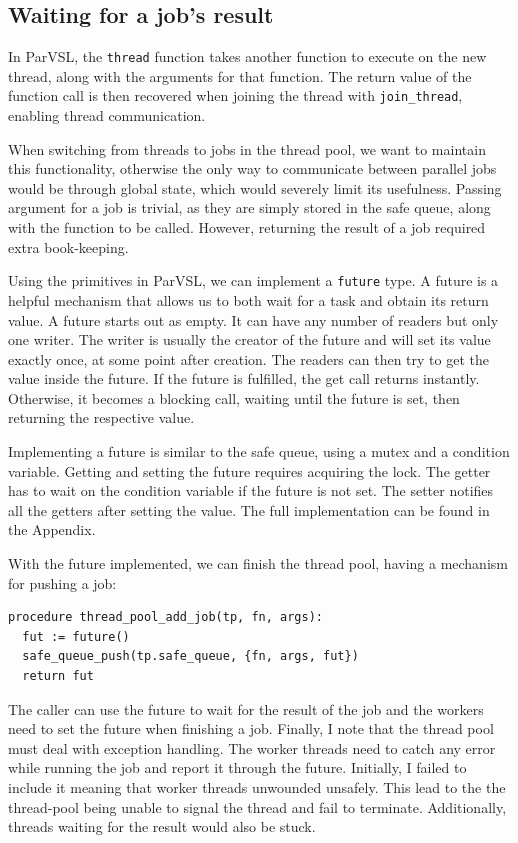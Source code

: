 \subsection{Waiting for a job's result}
\label{ssec:waitjob}

In ParVSL, the \texttt{thread} function takes another function to execute on the new thread,
along with the arguments for that function. The return value of the function call is
then recovered when joining the thread with \texttt{join\_thread}, enabling thread communication.

When switching from threads to jobs in the thread pool, we want to maintain this functionality,
otherwise the only way to communicate between parallel jobs would be through global state,
which would severely limit its usefulness. Passing argument for a job is trivial, as they are simply
stored in the safe queue, along with the function to be called. However, returning the result of
a job required extra book-keeping.

Using the primitives in ParVSL, we can implement a \texttt{future} type. A future is a helpful mechanism
that allows us to both wait for a task and obtain its return value. A future starts out as empty.
It can have any number of readers but only one writer. The writer is usually the creator of the future
and will set its value exactly once, at some point after creation. The readers can then try to get the
value inside the future. If the future is fulfilled, the get call returns instantly. Otherwise, it
becomes a blocking call, waiting until the future is set, then returning the respective value.

Implementing a future is similar to the safe queue, using a mutex and a condition variable.
Getting and setting the future requires acquiring the lock. The getter has to wait on the condition
variable if the future is not set. The setter notifies all the getters after setting the value.
The full implementation can be found in the Appendix.

With the future implemented, we can finish the thread pool, having a mechanism for pushing a job:

\begin{verbatim}
procedure thread_pool_add_job(tp, fn, args):
  fut := future()
  safe_queue_push(tp.safe_queue, {fn, args, fut})
  return fut
\end{verbatim}

The caller can use the future to wait for the result of the job and the workers need to set the future
when finishing a job. Finally, I note that the thread pool must deal with exception handling. The worker threads
need to catch any error while running the job and report it through the future. Initially, I failed to include
it meaning that worker threads unwounded unsafely. This lead to the the thread-pool being unable to signal the
thread and fail to terminate. Additionally, threads waiting for the result would also be stuck.

